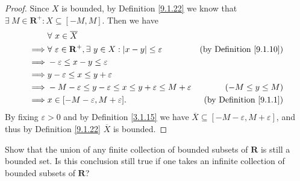 \begin{proof}
    Since \(X\) is bounded, by Definition \ref{9.1.22} we know that \(\exists\ M \in \mathbf{R}^+ : X \subseteq [-M, M]\).
    Then we have
    \begin{align*}
                 & \forall\ x \in \overline{X}                                                                                                   \\
        \implies & \forall\ \varepsilon \in \mathbf{R}^+, \exists\ y \in X : \abs*{x - y} \leq \varepsilon & \text{(by Definition \ref{9.1.10})} \\
        \implies & -\varepsilon \leq x - y \leq \varepsilon                                                                                      \\
        \implies & y - \varepsilon \leq x \leq y + \varepsilon                                                                                   \\
        \implies & -M - \varepsilon \leq y - \varepsilon \leq x \leq y + \varepsilon \leq M + \varepsilon  & (-M \leq y \leq M)                  \\
        \implies & x \in [-M - \varepsilon, M + \varepsilon].                                              & \text{(by Definition \ref{9.1.1})}
    \end{align*}
    By fixing \(\varepsilon > 0\) and by Definition \ref{3.1.15} we have \(\overline{X} \subseteq [-M - \varepsilon, M + \varepsilon]\), and thus by Definition \ref{9.1.22} \(\overline{X}\) is bounded.
\end{proof}

\begin{exercise}\label{ex 9.1.12}
    Show that the union of any finite collection of bounded subsets of \(\mathbf{R}\) is still a bounded set.
    Is this conclusion still true if one takes an infinite collection of bounded subsets of \(\mathbf{R}\)?
\end{exercise}

